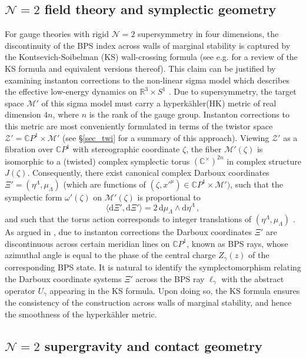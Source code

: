 \documentclass[12pt,reqno]{article}
\numberwithin{equation}{section}
\newcommand{\be}{\begin{equation}}
\newcommand{\ee}{\end{equation}}
\newcommand{\CP}{\IC P^1}
\newcommand{\de}{\mathrm{d}}
\newcommand{\cM}{\mathcal{M}}
\newcommand{\cN}{\mathcal{N}}
\newcommand{\cZ}{\mathcal{Z}}
\newcommand{\IR}{\mathbb{R}}
\newcommand{\IC}{\mathbb{C}}
\newcommand{\hk}{{hyperk\"ahler}\xspace}
\def\varpihk{\zeta}
\def\pcM{\cM'}
\def\pcZ{\cZ'}
\def\pomega{\omega'}
\def\pXi{\Xi'}
\numberwithin{equation}{section}
\begin{document}
\subsection*{$\cN=2$ field theory and symplectic geometry}

For gauge theories with rigid $\cN=2$ supersymmetry in four dimensions,
the discontinuity of the BPS index across walls of marginal stability is captured by the
Kontsevich-Soibelman (KS) wall-crossing formula \cite{ks} (see e.g. \cite{Pioline:2011gf} for a review
of the KS formula and equivalent versions thereof). This claim can be justified by
examining instanton corrections to the non-linear sigma model which describes the
effective low-energy dynamics on $\IR^3\times S^1$ \cite{Gaiotto:2008cd}.
Due to supersymmetry, the target space $\pcM$ of this sigma model
must  carry  a \hk (HK) metric of real dimension $4n$, where $n$ is the rank of the gauge group.
Instanton corrections to this metric are most conveniently formulated in terms
of the twistor space $\pcZ=\CP\times \pcM$ \cite{Hitchin:1986ea,Ivanov:1995cy,Alexandrov:2008ds}
(see \S\ref{sec_twi} for a summary of this approach).
Viewing $\pcZ$ as a fibration over $\CP$
with stereographic coordinate $\varpihk$, the fiber $\pcM(\varpihk)$ is isomorphic to
a (twisted) complex symplectic torus $(\IC^\times)^{2n}$ in complex structure $J(\varpihk)$.
Consequently, there exist  canonical complex Darboux coordinates
$\pXi=(\eta^\Lambda,\mu_\Lambda)$ (which are functions of
$(\varpihk,x'^\mu)\in \CP\times \pcM)$, such that the symplectic
form $\pomega(\varpihk)$ on $\pcM(\varpihk)$ is proportional to
\be
\label{omtintro}
 \langle \de \pXi, \de \pXi\rangle = 2\, \de \mu_\Lambda \wedge \de\eta^\Lambda \, ,
\ee
and such that the torus action corresponds to
integer translations of $(\eta^{\Lambda}, \mu_\Lambda)$ \cite{BPNeitzke}.
As argued in \cite{Gaiotto:2008cd}, due to
instanton corrections the Darboux coordinates $\pXi$ are discontinuous across
certain meridian lines on $\CP$, known as BPS rays, whose azimuthal angle is equal to the phase
of the central charge $Z_\gamma(z)$ of the corresponding BPS state.
It is natural to identify the symplectomorphism relating the Darboux coordinate
systems $\pXi$ across the BPS ray $\ell_\gamma$
with the abstract operator $U_\gamma$ appearing in the KS formula. Upon doing so, the KS
formula ensures the consistency of the construction across walls
of marginal stability, and hence the smoothness of the \hk metric.

\subsection*{$\cN=2$ supergravity and contact geometry}
\end{document}

